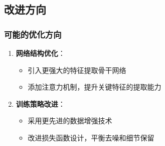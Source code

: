 \documentclass[UTF8]{ctexart}
\begin{document}
\subsection{改进方向}

\subsubsection{可能的优化方向}
\begin{enumerate}
    \item \textbf{网络结构优化}：
    \begin{itemize}
        \item 引入更强大的特征提取骨干网络
        \item 添加注意力机制，提升关键特征的提取能力
    \end{itemize}
    
    \item \textbf{训练策略改进}：
    \begin{itemize}
        \item 采用更先进的数据增强技术
        \item 改进损失函数设计，平衡去噪和细节保留
    \end{itemize}
\end{enumerate}
\end{document}

